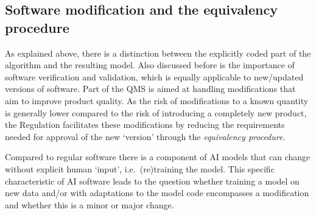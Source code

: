 \documentclass[
]{scrartcl}
\begin{document}
\hypertarget{software-modification-and-the-equivalency-procedure}{%
\subsection{Software modification and the equivalency procedure}\label{software-modification-and-the-equivalency-procedure}}

As explained above, there is a distinction between the explicitly coded part of the algorithm and the resulting model. Also discussed before is the importance of software verification and validation, which is equally applicable to new/updated versions of software. Part of the QMS is aimed at handling modifications that aim to improve product quality. As the risk of modifications to a known quantity is generally lower compared to the risk of introducing a completely new product, the Regulation facilitates these modifications by reducing the requirements needed for approval of the new `version' through the \emph{equivalency procedure}.

Compared to regular software there is a component of AI models that can change without explicit human `input', i.e.~(re)training the model. This specific characteristic of AI software leads to the question whether training a model on new data and/or with adaptations to the model code encompasses a modification and whether this is a minor or major change.
\end{document}
